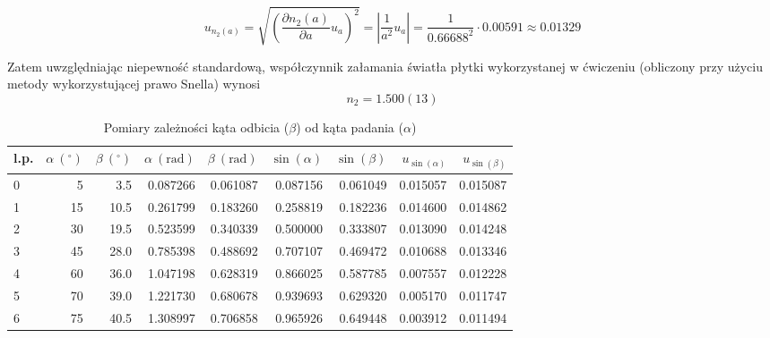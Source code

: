 \documentclass[a4paper]{article}
\begin{document}
\[
		u_{n_2(a)} = \sqrt{\left(\frac{\partial n_2(a)}{\partial a}u_{a}\right)^2} = 
		\left| \frac{1}{a^2} u_{a}\right| = \frac{1}{0.66688^2}\cdot 0.00591 \approx 0.01329
\]

Zatem uwzględniając niepewność standardową, współczynnik załamania światła płytki wykorzystanej w ćwiczeniu (obliczony przy użyciu metody wykorzystującej prawo Snella) wynosi \[ n_2 = 1.500(13)\]
\begin{table}
\centering
\begin{tabular}{lrrrrrrrr}
\toprule

l.p.&  $\alpha \ ({}^\circ)$ & $\beta \ ({}^\circ)$ &  $\alpha \ (\text{rad})$ &  $\beta \ (\text{rad})$ &  $\sin(\alpha)$ &  $\sin(\beta)$ &  $u_{\sin(\alpha)}$ &  $u_{\sin(\beta)}$ \\
\midrule
0  &           5 &         3.5& 0.087266 &    0.061087 &   0.087156 &   0.061049 &              0.015057 &              0.015087 \\
1  &          15 &        10.5 & 0.261799 &    0.183260 &   0.258819 &   0.182236 &              0.014600 &              0.014862 \\
2 & 30 & 19.5 &0.523599 &    0.340339 &   0.500000 &   0.333807 &              0.013090 &              0.014248 \\
3&          45 &        28.0 & 0.785398 &    0.488692 &   0.707107 &   0.469472 &              0.010688 &              0.013346 \\
4&          60 &        36.0 & 1.047198 &    0.628319 &   0.866025 &   0.587785 &              0.007557 &              0.012228 \\
5  &          70 &        39.0& 1.221730 &    0.680678 &   0.939693 &   0.629320 &              0.005170 &              0.011747 \\
6 &          75 &        40.5& 1.308997 &    0.706858 &   0.965926 &   0.649448 &              0.003912 &              0.011494 \\
\bottomrule
\end{tabular}

\caption{Pomiary zależności kąta odbicia ($\beta$) od kąta padania ($\alpha$)}
\label{snell-pomiary}
\end{table}
\end{document}
